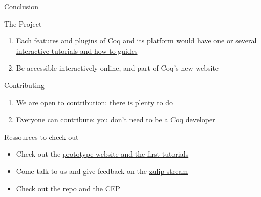 \documentclass[10pt]{beamer}
\begin{document}
\begin{frame}[fragile]{Conclusion}
  \begin{tcbObj}{The Project}
    \begin{enumerate}
      \item Each features and plugins of Coq and its platform would have one
            or several \ul{interactive tutorials and how-to guides}
      \item Be accessible interactively online, and part of Coq's new website
    \end{enumerate}
  \end{tcbObj}
  \begin{tcbObj}{Contributing}
    \begin{enumerate}
      \item We are open to contribution: there is plenty to do
      \item Everyone can contribute: you don't need to be a Coq developer
    \end{enumerate}
  \end{tcbObj}
  \begin{tcbProp}{Ressources to check out}
    \begin{itemize}[label=$-$]
      \item Check out the \textcolor{blue}{\href{https://coq.inria.fr/platform-docs/}{prototype website and the first tutorials}}
      \item Come talk to us and give feedback on the \textcolor{blue}{\href{https://www.theozimmermann.net/platform-docs/}{zulip stream}}
      \item Check out the \textcolor{blue}{\href{https://github.com/coq/platform-docs}{repo}} and the \textcolor{blue}{\href{https://github.com/coq/ceps/pull/91}{CEP}}
    \end{itemize}
  \end{tcbProp}
\end{frame}
\end{document}
